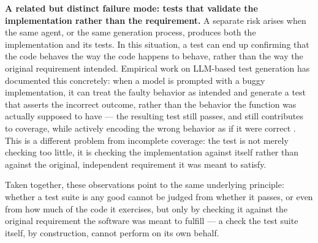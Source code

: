 \textbf{A related but distinct failure mode: tests that validate the implementation rather than the requirement.} A separate risk arises when the same agent, or the same generation process, produces both the implementation and its tests. In this situation, a test can end up confirming that the code behaves the way the code happens to behave, rather than the way the original requirement intended. Empirical work on LLM-based test generation has documented this concretely: when a model is prompted with a buggy implementation, it can treat the faulty behavior as intended and generate a test that asserts the incorrect outcome, rather than the behavior the function was actually supposed to have --- the resulting test still passes, and still contributes to coverage, while actively encoding the wrong behavior as if it were correct \cite{mathews2024design}. This is a different problem from incomplete coverage: the test is not merely checking too little, it is checking the implementation against itself rather than against the original, independent requirement it was meant to satisfy.

Taken together, these observations point to the same underlying principle: whether a test suite is any good cannot be judged from whether it passes, or even from how much of the code it exercises, but only by checking it against the original requirement the software was meant to fulfill --- a check the test suite itself, by construction, cannot perform on its own behalf.

